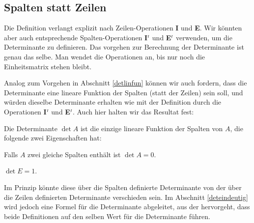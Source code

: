 \subsection{Spalten statt Zeilen}
Die Definition verlangt explizit nach Zeilen-Operationen {\bf I}
und {\bf E}.
Wir könnten aber auch entsprechende Spalten-Operationen
{\bf I$\mathstrut^t$}
und
{\bf E$\mathstrut^t$}
verwenden, um die Determinante zu definieren.
Das vorgehen zur Berechnung der Determinante ist genau das selbe.
Man wendet die Operationen an, bis nur noch die Einheitsmatrix stehen bleibt.

Analog zum Vorgehen in Abschnitt \ref{detlinfun} können wir auch
fordern, dass die Determinante eine lineare Funktion der Spalten
(statt der Zeilen) sein soll, und würden dieselbe Determinante
erhalten wie mit der Definition durch die Operationen 
{\bf I$\mathstrut^t$}
und
{\bf E$\mathstrut^t$}.
Auch hier halten wir das Resultat fest:
\begin{satz}
Die Determinante
$\det A$ ist die einzige lineare Funktion der Spalten von $A$, die folgende
zwei Eigenschaften hat:
\begin{compactenum}
\item Falls $A$ zwei gleiche Spalten enthält ist $\det A=0$.
\item $\det E = 1$.
\end{compactenum}
\end{satz}
Im Prinzip könnte diese über die Spalten definierte Determinante
von der über die Zeilen definierten Determinante verschieden sein.
Im Abschnitt \ref{deteindeutig} wird jedoch eine Formel für die
Determinante abgeleitet, aus der hervorgeht, dass beide Definitionen
auf den selben Wert für die Determinante führen.

